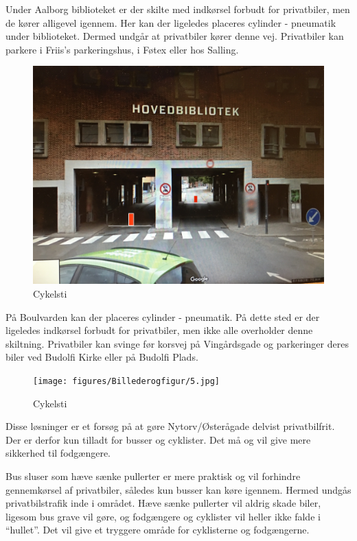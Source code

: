 Under Aalborg biblioteket er der skilte med indkørsel forbudt for privatbiler, men de kører alligevel igennem. Her kan der ligeledes placeres cylinder - pneumatik under biblioteket. Dermed undgår at privatbiler kører denne vej. Privatbiler kan parkere i Friis’s parkeringshus, i Føtex eller hos Salling.
\begin{figure}[htbp]
  \centering
  \begin{adjustbox}{max width=\textwidth}
    \includegraphics{figures/Billederogfigur/4.jpg}
 \end{adjustbox}
  \caption{Cykelsti}
   \label{fig:cykelsti}
\end{figure}

På Boulvarden kan der placeres cylinder - pneumatik. På dette sted er der ligeledes indkørsel forbudt for privatbiler, men ikke alle overholder denne skiltning. Privatbiler kan svinge før korsvej på Vingårdsgade og parkeringer deres biler ved Budolfi Kirke eller på Budolfi Plads.
\begin{figure}[htbp]
  \centering
  \begin{adjustbox}{max width=\textwidth}
    \texttt{[image: figures/Billederogfigur/5.jpg]}
 \end{adjustbox}
  \caption{Cykelsti}
   \label{fig:cykelsti}
\end{figure}
Disse løsninger er et forsøg på at gøre Nytorv/Østerågade delvist privatbilfrit. Der er derfor kun tilladt for busser og cyklister. Det må og vil give mere sikkerhed til fodgængere.

Bus sluser som hæve sænke pullerter er mere praktisk og vil forhindre gennemkørsel af privatbiler, således kun busser kan køre igennem. Hermed undgås privatbilstrafik inde i området. Hæve sænke pullerter vil aldrig skade biler, ligesom bus grave vil gøre, og fodgængere og cyklister vil heller ikke falde i “hullet”. Det vil give et tryggere område for cyklisterne og fodgængerne.
